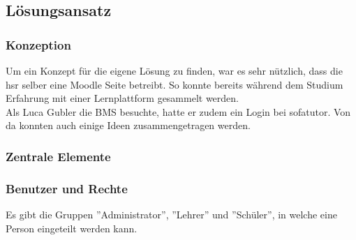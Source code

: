 %
%
%


\subsection{Lösungsansatz}
\subsubsection{Konzeption}
Um ein Konzept für die eigene Lösung zu finden, war es sehr nützlich, dass die \gls{hsr} selber eine Moodle Seite betreibt. So konnte bereits während dem Studium Erfahrung mit einer Lernplattform gesammelt werden. \\

Als Luca Gubler die BMS besuchte, hatte er zudem ein Login bei sofatutor. Von da konnten auch einige Ideen zusammengetragen werden. 


\subsubsection{Zentrale Elemente}
\subsubsection*{Benutzer und Rechte}
Es gibt die Gruppen ''Administrator'', ''Lehrer'' und ''Schüler'', in welche eine Person eingeteilt werden kann. \\

